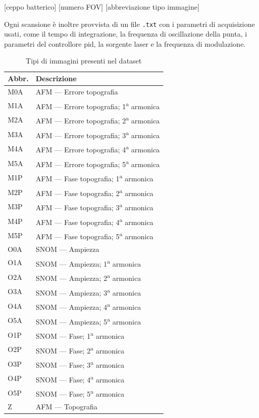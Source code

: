 \documentclass[../main.tex]{subfiles}
\begin{document}
\begin{center}
[ceppo batterico] [numero FOV] [abbreviazione tipo immagine]
\end{center}

Ogni scansione è inoltre provvista di un file \texttt{.txt} con i parametri di acquisizione usati, come il tempo di integrazione, la frequenza di oscillazione della punta, i parametri del controllore \acrshort{pid}, la sorgente laser e la frequenza di modulazione.

\begin{table}[h!t]
\centering
\begin{tabular}{l|l}
	Abbr. & Descrizione\\
	\hline\hline
	M0A & AFM --- Errore topografia\\
	M1A & AFM --- Errore topografia; 1\textsuperscript{a} armonica\\
	M2A & AFM --- Errore topografia; 2\textsuperscript{a} armonica\\
	M3A & AFM --- Errore topografia; 3\textsuperscript{a} armonica\\
	M4A & AFM --- Errore topografia; 4\textsuperscript{a} armonica\\
	M5A & AFM --- Errore topografia; 5\textsuperscript{a} armonica\\
	M1P & AFM --- Fase topografia; 1\textsuperscript{a} armonica\\
	M2P & AFM --- Fase topografia; 2\textsuperscript{a} armonica\\
	M3P & AFM --- Fase topografia; 3\textsuperscript{a} armonica\\
	M4P & AFM --- Fase topografia; 4\textsuperscript{a} armonica\\
	M5P & AFM --- Fase topografia; 5\textsuperscript{a} armonica\\
	O0A & SNOM --- Ampiezza\\
	O1A & SNOM --- Ampiezza; 1\textsuperscript{a} armonica\\
	O2A & SNOM --- Ampiezza; 2\textsuperscript{a} armonica\\
	O3A & SNOM --- Ampiezza; 3\textsuperscript{a} armonica\\
	O4A & SNOM --- Ampiezza; 4\textsuperscript{a} armonica\\
	O5A & SNOM --- Ampiezza; 5\textsuperscript{a} armonica\\
	O1P & SNOM --- Fase; 1\textsuperscript{a} armonica\\
	O2P & SNOM --- Fase; 2\textsuperscript{a} armonica\\
	O3P & SNOM --- Fase; 3\textsuperscript{a} armonica\\
	O4P & SNOM --- Fase; 4\textsuperscript{a} armonica\\
	O5P & SNOM --- Fase; 5\textsuperscript{a} armonica\\
	Z & AFM --- Topografia
\end{tabular}
\caption{Tipi di immagini presenti nel dataset}
\end{table}
\end{document}
